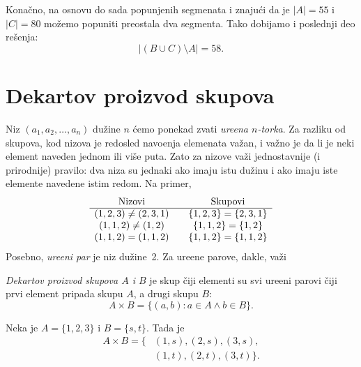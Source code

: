 \medskip

\noindent
\begin{minipage}{3in}
  Kona\v cno, na osnovu do sada popunjenih segmenata i znaju\'ci da je $|A| = 55$ i $|C| = 80$
  mo\v zemo popuniti preostala dva segmenta. Tako dobijamo i poslednji deo re\v senja:
  $$
    |(B \cup C) \setminus A| = 58.
  $$
\end{minipage}
\hfill
\begin{minipage}{2.5in}
  \begin{center}
    
  \end{center}
\end{minipage}

\section{Dekartov proizvod skupova}

Niz $(a_1, a_2, \ldots, a_n)$ du\v zine $n$ \'cemo ponekad zvati \emph{ure\dj ena $n$-torka}.
Za razliku od skupova, kod nizova je redosled
navo\dj enja elemenata va\v zan, i va\v zno je da li je neki element naveden jednom ili vi\v se puta. Zato za nizove va\v zi
jednostavnije (i prirodnije) pravilo: dva niza su jednaki ako imaju istu du\v zinu i ako imaju iste elemente navedene istim redom.
Na primer,
$$
  \begin{array}{c@{\qquad}c}
    \text{Nizovi} & \text{Skupovi} \\ \hline
    (1, 2, 3) \ne (2, 3, 1) & \{1, 2, 3\} = \{2, 3, 1\}\\
    (1, 1, 2) \ne (1, 2) & \{1, 1, 2\} = \{1, 2\}\\
    (1, 1, 2) = (1, 1, 2) & \{1, 1, 2\} = \{1, 1, 2\}
  \end{array}
$$
Posebno, \emph{ure\dj eni par} je niz du\v zine~2. Za ure\dj ene parove, dakle, va\v zi
\begin{center}
\end{center}

\begin{DEF}
  \emph{Dekartov proizvod skupova $A$ i $B$} je skup \v ciji elementi su svi ure\dj eni parovi \v ciji prvi
  element pripada skupu $A$, a drugi skupu $B$:
  $$
    A \times B = \{(a, b) : a \in A \land b \in B\}.
  $$
\end{DEF}

\begin{EX}\label{ft06.ex.3x2}
  Neka je $A = \{1, 2, 3\}$ i $B = \{s, t\}$.
  Tada je
  \begin{align*}
  A \times B = \{ &(1,s), (2,s), (3,s),\\
                  &(1,t), (2,t), (3,t)\}.
  \end{align*}
\end{EX}

